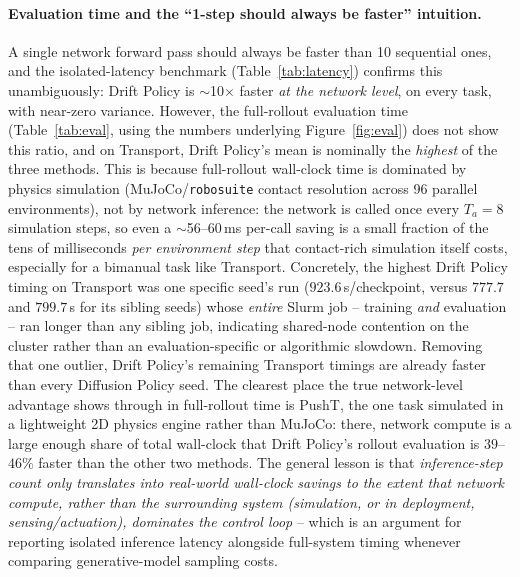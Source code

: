 \documentclass[11pt]{article}
\begin{document}
\paragraph{Evaluation time and the ``1-step should always be faster'' intuition.}
\label{sec:eval_discussion}
A single network forward pass should always be faster than 10 sequential
ones, and the isolated-latency benchmark (Table~\ref{tab:latency}) confirms
this unambiguously: Drift Policy is $\sim$10$\times$ faster \emph{at the
network level}, on every task, with near-zero variance. However, the
full-rollout evaluation time (Table~\ref{tab:eval}, using the numbers
underlying Figure~\ref{fig:eval}) does not show this ratio, and on
Transport, Drift Policy's mean is nominally the \emph{highest} of the three
methods. This is because full-rollout wall-clock time is dominated by
physics simulation (MuJoCo/\texttt{robosuite} contact resolution across 96
parallel environments), not by network inference: the network is called
once every $T_a=8$ simulation steps, so even a $\sim$56--60\,ms
per-call saving is a small fraction of the tens of milliseconds
\emph{per environment step} that contact-rich simulation itself costs,
especially for a bimanual task like Transport. Concretely, the highest
Drift Policy timing on Transport was one specific seed's run
($923.6$\,s/checkpoint, versus $777.7$ and $799.7$\,s for its sibling seeds)
whose \emph{entire} Slurm job -- training \emph{and} evaluation -- ran
longer than any sibling job, indicating shared-node contention on the
cluster rather than an evaluation-specific or algorithmic slowdown. Removing
that one outlier, Drift Policy's remaining Transport timings are already
faster than every Diffusion Policy seed. The clearest place the true
network-level advantage shows through in full-rollout time is PushT, the
one task simulated in a lightweight 2D physics engine rather than MuJoCo:
there, network compute is a large enough share of total wall-clock that
Drift Policy's rollout evaluation is $39$--$46\%$ faster than the other two
methods. The general lesson is that \emph{inference-step count only
translates into real-world wall-clock savings to the extent that network
compute, rather than the surrounding system (simulation, or in deployment,
sensing/actuation), dominates the control loop} -- which is an argument for
reporting isolated inference latency alongside full-system timing whenever
comparing generative-model sampling costs.
\end{document}
